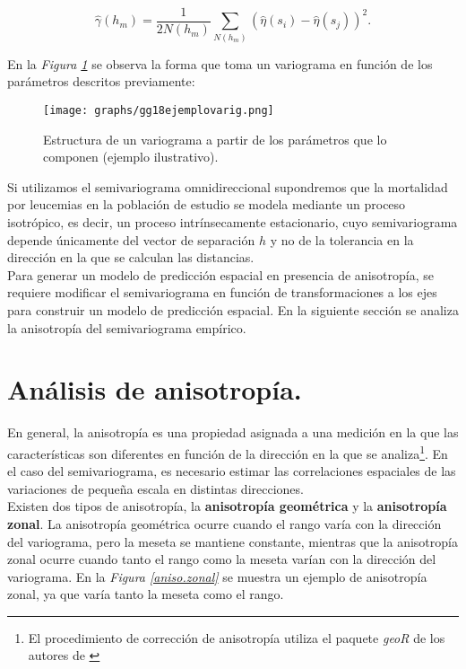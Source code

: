 \documentclass[11pt, oneside]{book}
\begin{document}
$$\hat{\gamma}(h_m) = \frac{1}{2N(h_m)}\sum_{N(h_m)}(\hat{\eta}(s_i)-\hat{\eta}(s_j))^2.$$

\bigskip

En la \emph{Figura \ref{semivariograma}} se observa la forma que toma un variograma en función de los parámetros descritos previamente:

\begin{figure}[ht]
    \centering
    \texttt{[image: graphs/gg18ejemplovarig.png]}
  \caption{Estructura de un variograma a partir de los parámetros que lo componen (ejemplo ilustrativo).}
  \label{semivariograma}
\end{figure}

Si utilizamos el semivariograma omnidireccional supondremos que la mortalidad por leucemias en la población de estudio se modela mediante un proceso isotrópico, es decir, un proceso intrínsecamente estacionario, cuyo semivariograma depende únicamente del vector de separación $h$ y no de la tolerancia en la dirección en la que se calculan las distancias.\\ 

Para generar un modelo de predicción espacial en presencia de anisotropía, se requiere modificar el semivariograma en función de transformaciones a los ejes para construir un modelo de predicción espacial. En la siguiente sección se analiza la anisotropía del semivariograma empírico.

\bigskip

\section{Análisis de anisotropía.}
En general, la anisotropía es una propiedad asignada a una medición en la que las características son diferentes en función de la dirección en la que se analiza\footnote{El procedimiento de corrección de anisotropía utiliza el paquete \emph{geoR} de los autores de \cite{diggle}}. En el caso del semivariograma, es necesario estimar las correlaciones espaciales de las variaciones de pequeña escala en distintas direcciones. \\ 

Existen dos tipos de anisotropía, la \textbf{anisotropía geométrica} y la \textbf{anisotropía zonal}. La anisotropía geométrica ocurre cuando el rango varía con la dirección del variograma, pero la meseta se mantiene constante, mientras que la anisotropía zonal ocurre cuando tanto el rango como la meseta varían con la dirección del variograma. En la \emph{Figura \ref{aniso.zonal}} se muestra un ejemplo de anisotropía zonal, ya que varía tanto la meseta como el rango.\\
\end{document}
